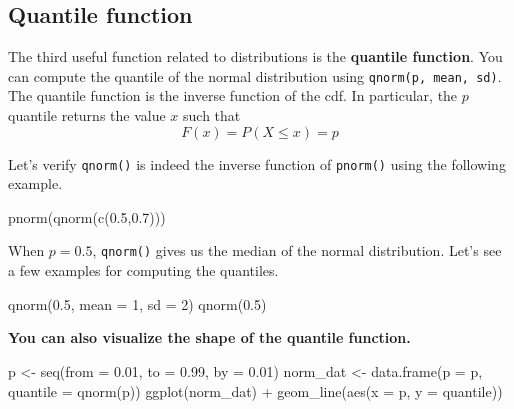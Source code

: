 \documentclass[
]{book}
\newenvironment{Shaded}{\begin{snugshade}}{\end{snugshade}}
\newcommand{\AttributeTok}[1]{\textcolor[rgb]{0.77,0.63,0.00}{#1}}
\newcommand{\DecValTok}[1]{\textcolor[rgb]{0.00,0.00,0.81}{#1}}
\newcommand{\FloatTok}[1]{\textcolor[rgb]{0.00,0.00,0.81}{#1}}
\newcommand{\FunctionTok}[1]{\textcolor[rgb]{0.00,0.00,0.00}{#1}}
\newcommand{\NormalTok}[1]{#1}
\newcommand{\OtherTok}[1]{\textcolor[rgb]{0.56,0.35,0.01}{#1}}
\newcommand{\SpecialCharTok}[1]{\textcolor[rgb]{0.00,0.00,0.00}{#1}}
\begin{document}
\hypertarget{qf}{%
\subsection{Quantile function}\label{qf}}

The third useful function related to distributions is the \textbf{quantile function}. You can compute the quantile of the normal distribution using \texttt{qnorm(p,\ mean,\ sd)}. The quantile function is the inverse function of the cdf. In particular, the \(p\) quantile returns the value \(x\) such that
\[F(x) = P(X\leq x) =  p\]

Let's verify \texttt{qnorm()} is indeed the inverse function of \texttt{pnorm()} using the following example.

\begin{Shaded}
\begin{Highlighting}[]
\FunctionTok{pnorm}\NormalTok{(}\FunctionTok{qnorm}\NormalTok{(}\FunctionTok{c}\NormalTok{(}\FloatTok{0.5}\NormalTok{,}\FloatTok{0.7}\NormalTok{)))}
\end{Highlighting}
\end{Shaded}

When \(p=0.5\), \texttt{qnorm()} gives us the median of the normal distribution.
Let's see a few examples for computing the quantiles.

\begin{Shaded}
\begin{Highlighting}[]
\FunctionTok{qnorm}\NormalTok{(}\FloatTok{0.5}\NormalTok{, }\AttributeTok{mean =} \DecValTok{1}\NormalTok{, }\AttributeTok{sd =} \DecValTok{2}\NormalTok{)}
\FunctionTok{qnorm}\NormalTok{(}\FloatTok{0.5}\NormalTok{)}
\end{Highlighting}
\end{Shaded}

\textbf{You can also visualize the shape of the quantile function.}

\begin{Shaded}
\begin{Highlighting}[]
\NormalTok{p }\OtherTok{\textless{}{-}} \FunctionTok{seq}\NormalTok{(}\AttributeTok{from =}  \FloatTok{0.01}\NormalTok{, }\AttributeTok{to =} \FloatTok{0.99}\NormalTok{, }\AttributeTok{by =} \FloatTok{0.01}\NormalTok{)}
\NormalTok{norm\_dat }\OtherTok{\textless{}{-}} \FunctionTok{data.frame}\NormalTok{(}\AttributeTok{p =}\NormalTok{ p, }\AttributeTok{quantile =} \FunctionTok{qnorm}\NormalTok{(p))}
\FunctionTok{ggplot}\NormalTok{(norm\_dat) }\SpecialCharTok{+} \FunctionTok{geom\_line}\NormalTok{(}\FunctionTok{aes}\NormalTok{(}\AttributeTok{x =}\NormalTok{ p, }\AttributeTok{y =}\NormalTok{ quantile))}
\end{Highlighting}
\end{Shaded}
\end{document}
